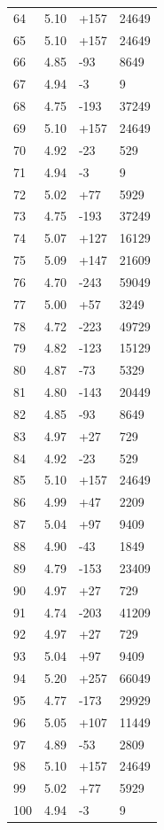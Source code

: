 \documentclass[12pt]{article}
\begin{document}
\begin{xltabular}{\textwidth}{@{}X X X X@{}}
		64 & 5.10 & +157 & 24649 \\
		65 & 5.10 & +157 & 24649 \\
		66 & 4.85 & -93 & 8649 \\
		67 & 4.94 & -3 & 9 \\
		68 & 4.75 & -193 & 37249 \\
		69 & 5.10 & +157 & 24649 \\
		70 & 4.92 & -23 & 529 \\
		71 & 4.94 & -3 & 9 \\
		72 & 5.02 & +77 & 5929 \\
		73 & 4.75 & -193 & 37249 \\
		74 & 5.07 & +127 & 16129 \\
		75 & 5.09 & +147 & 21609 \\
		76 & 4.70 & -243 & 59049 \\
		77 & 5.00 & +57 & 3249 \\
		78 & 4.72 & -223 & 49729 \\
		79 & 4.82 & -123 & 15129 \\
		80 & 4.87 & -73 & 5329 \\
		81 & 4.80 & -143 & 20449 \\
		82 & 4.85 & -93 & 8649 \\
		83 & 4.97 & +27 & 729 \\
		84 & 4.92 & -23 & 529 \\
		85 & 5.10 & +157 & 24649 \\
		86 & 4.99 & +47 & 2209 \\
		87 & 5.04 & +97 & 9409 \\
		88 & 4.90 & -43 & 1849 \\
		89 & 4.79 & -153 & 23409 \\
		90 & 4.97 & +27 & 729 \\
		91 & 4.74 & -203 & 41209 \\
		92 & 4.97 & +27 & 729 \\
		93 & 5.04 & +97 & 9409 \\
		94 & 5.20 & +257 & 66049 \\
		95 & 4.77 & -173 & 29929 \\
		96 & 5.05 & +107 & 11449 \\
		97 & 4.89 & -53 & 2809 \\
		98 & 5.10 & +157 & 24649 \\
		99 & 5.02 & +77 & 5929 \\
		100 & 4.94 & -3 & 9 \\
	\end{xltabular}
	\normalsize
\end{document}
